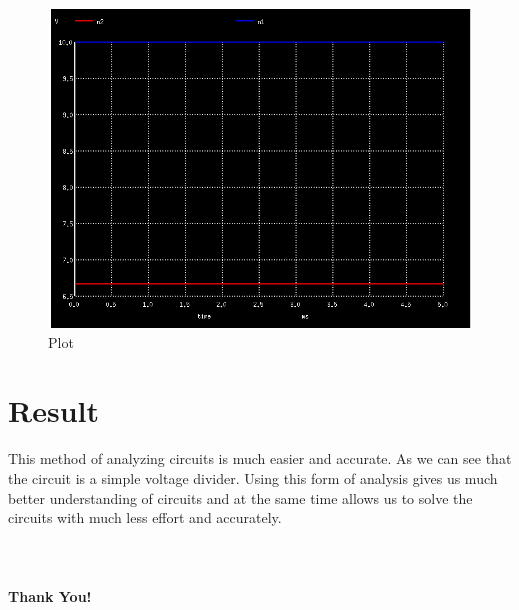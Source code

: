 \documentclass[a4paper,12pt]{article}
\begin{document}
\begin{figure}[h!]
\centering
\includegraphics[width=1\textwidth]{plot.png}
\caption{Plot}
\end{figure}

\newpage

\section{Result}
This method of analyzing circuits is much easier and accurate. As we can see that the circuit is a simple voltage divider. Using this form of analysis gives us much better understanding of circuits and at the same time allows us to solve the circuits with much less effort and accurately.\\\\\\\\

\centering
\textbf{Thank You!}
\end{document}
